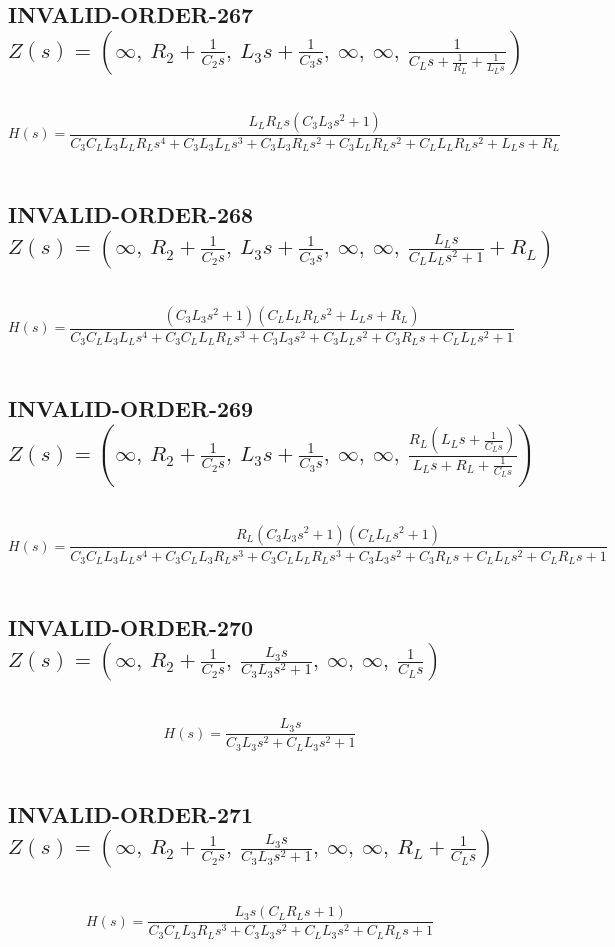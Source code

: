 \documentclass{article}
\begin{document}
\subsection{INVALID-ORDER-267 $Z(s) = \left( \infty, \  R_{2} + \frac{1}{C_{2} s}, \  L_{3} s + \frac{1}{C_{3} s}, \  \infty, \  \infty, \  \frac{1}{C_{L} s + \frac{1}{R_{L}} + \frac{1}{L_{L} s}}\right)$ } \ 
\textbf{\[H(s) = \frac{L_{L} R_{L} s \left(C_{3} L_{3} s^{2} + 1\right)}{C_{3} C_{L} L_{3} L_{L} R_{L} s^{4} + C_{3} L_{3} L_{L} s^{3} + C_{3} L_{3} R_{L} s^{2} + C_{3} L_{L} R_{L} s^{2} + C_{L} L_{L} R_{L} s^{2} + L_{L} s + R_{L}}\] } \ 
\subsection{INVALID-ORDER-268 $Z(s) = \left( \infty, \  R_{2} + \frac{1}{C_{2} s}, \  L_{3} s + \frac{1}{C_{3} s}, \  \infty, \  \infty, \  \frac{L_{L} s}{C_{L} L_{L} s^{2} + 1} + R_{L}\right)$ } \ 
\textbf{\[H(s) = \frac{\left(C_{3} L_{3} s^{2} + 1\right) \left(C_{L} L_{L} R_{L} s^{2} + L_{L} s + R_{L}\right)}{C_{3} C_{L} L_{3} L_{L} s^{4} + C_{3} C_{L} L_{L} R_{L} s^{3} + C_{3} L_{3} s^{2} + C_{3} L_{L} s^{2} + C_{3} R_{L} s + C_{L} L_{L} s^{2} + 1}\] } \ 
\subsection{INVALID-ORDER-269 $Z(s) = \left( \infty, \  R_{2} + \frac{1}{C_{2} s}, \  L_{3} s + \frac{1}{C_{3} s}, \  \infty, \  \infty, \  \frac{R_{L} \left(L_{L} s + \frac{1}{C_{L} s}\right)}{L_{L} s + R_{L} + \frac{1}{C_{L} s}}\right)$ } \ 
\textbf{\[H(s) = \frac{R_{L} \left(C_{3} L_{3} s^{2} + 1\right) \left(C_{L} L_{L} s^{2} + 1\right)}{C_{3} C_{L} L_{3} L_{L} s^{4} + C_{3} C_{L} L_{3} R_{L} s^{3} + C_{3} C_{L} L_{L} R_{L} s^{3} + C_{3} L_{3} s^{2} + C_{3} R_{L} s + C_{L} L_{L} s^{2} + C_{L} R_{L} s + 1}\] } \ 
\subsection{INVALID-ORDER-270 $Z(s) = \left( \infty, \  R_{2} + \frac{1}{C_{2} s}, \  \frac{L_{3} s}{C_{3} L_{3} s^{2} + 1}, \  \infty, \  \infty, \  \frac{1}{C_{L} s}\right)$ } \ 
\textbf{\[H(s) = \frac{L_{3} s}{C_{3} L_{3} s^{2} + C_{L} L_{3} s^{2} + 1}\] } \ 
\subsection{INVALID-ORDER-271 $Z(s) = \left( \infty, \  R_{2} + \frac{1}{C_{2} s}, \  \frac{L_{3} s}{C_{3} L_{3} s^{2} + 1}, \  \infty, \  \infty, \  R_{L} + \frac{1}{C_{L} s}\right)$ } \ 
\textbf{\[H(s) = \frac{L_{3} s \left(C_{L} R_{L} s + 1\right)}{C_{3} C_{L} L_{3} R_{L} s^{3} + C_{3} L_{3} s^{2} + C_{L} L_{3} s^{2} + C_{L} R_{L} s + 1}\] } \ 
\end{document}
